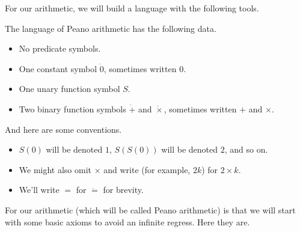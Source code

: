 For our arithmetic, we will build a language with the following tools.
\begin{definition}
	The language of Peano arithmetic has the following data.
	\begin{itemize}
		\item No predicate symbols.
		\item One constant symbol $\dot0$, sometimes written $0$.
		\item One unary function symbol $S$.
		\item Two binary function symbols $\dot+$ and $\dot\times$, sometimes written $+$ and $\times$.
	\end{itemize}
\end{definition}
And here are some conventions.
\begin{itemize}
	\item $S(0)$ will be denoted $1$, $S(S(0))$ will be denoted $2$, and so on.
	\item We might also omit $\times$ and write (for example, $2k$) for $2\times k$.
	\item We'll write $=$ for $\dot=$ for brevity.
\end{itemize}
For our arithmetic (which will be called Peano arithmetic) is that we will start with some basic axioms to avoid an infinite regress. Here they are.

